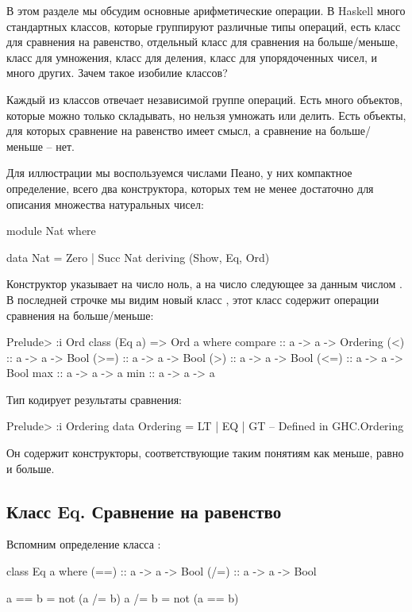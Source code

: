 В этом разделе мы обсудим основные арифметические операции.
В Haskell много стандартных классов, которые группируют различные
типы операций, есть класс для сравнения на равенство, отдельный класс 
для сравнения на больше/меньше, класс для умножения, класс для деления,
класс для упорядоченных чисел, и много других. Зачем такое изобилие
классов? 

Каждый из классов отвечает независимой группе операций.
Есть много объектов, которые можно только складывать, но нельзя 
умножать или делить. Есть объекты, для которых сравнение на равенство
имеет смысл, а сравнение на больше/меньше -- нет. 

Для иллюстрации мы воспользуемся числами Пеано, у них 
компактное определение, всего два конструктора, которых
тем не менее достаточно для описания множества натуральных чисел:

\begin{code}
module Nat where

data Nat = Zero | Succ Nat
    deriving (Show, Eq, Ord)
\end{code}

Конструктор  указывает на число ноль,
а  на число следующее за данным числом .
В последней строчке мы видим новый класс 
 , 
этот класс содержит операции сравнения на больше/меньше:

\begin{code}
Prelude> :i Ord
class (Eq a) => Ord a where
  compare :: a -> a -> Ordering
  (<) :: a -> a -> Bool
  (>=) :: a -> a -> Bool
  (>) :: a -> a -> Bool
  (<=) :: a -> a -> Bool
  max :: a -> a -> a
  min :: a -> a -> a
\end{code}

Тип  кодирует результаты сравнения:

\begin{code}
Prelude> :i Ordering
data Ordering = LT | EQ | GT 	-- Defined in GHC.Ordering
\end{code}

Он содержит конструкторы, соответствующие таким
понятиям как меньше, равно и больше.

\subsection{Класс Eq. Сравнение на равенство}

Вспомним определение класса :

\begin{code}
class Eq a where
    (==) :: a -> a -> Bool
    (/=) :: a -> a -> Bool

    a == b = not (a /= b)
    a /= b = not (a == b)
\end{code}

